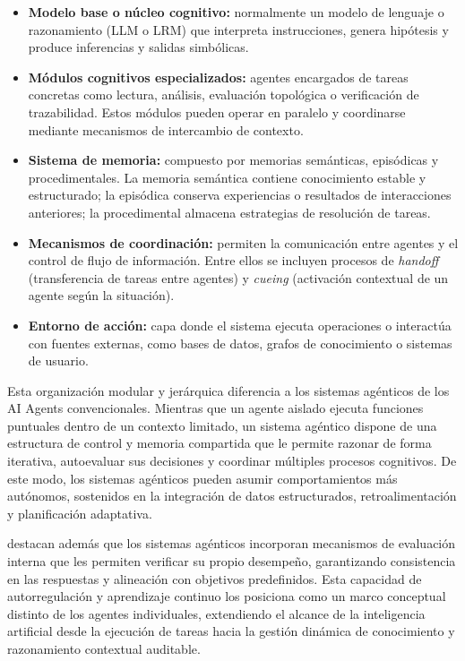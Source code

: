\documentclass[12pt,letterpaper]{article}
\begin{document}
\begin{itemize}
    \item \textbf{Modelo base o núcleo cognitivo:} normalmente un modelo de lenguaje o razonamiento (LLM o LRM) que interpreta instrucciones, genera hipótesis y produce inferencias y salidas simbólicas.
    \item \textbf{Módulos cognitivos especializados:} agentes encargados de tareas concretas como lectura, análisis, evaluación topológica o verificación de trazabilidad. Estos módulos pueden operar en paralelo y coordinarse mediante mecanismos de intercambio de contexto.
    \item \textbf{Sistema de memoria:} compuesto por memorias semánticas, episódicas y procedimentales. La memoria semántica contiene conocimiento estable y estructurado; la episódica conserva experiencias o resultados de interacciones anteriores; la procedimental almacena estrategias de resolución de tareas.
    \item \textbf{Mecanismos de coordinación:} permiten la comunicación entre agentes y el control de flujo de información. Entre ellos se incluyen procesos de \textit{handoff} (transferencia de tareas entre agentes) y \textit{cueing} (activación contextual de un agente según la situación).
    \item \textbf{Entorno de acción:} capa donde el sistema ejecuta operaciones o interactúa con fuentes externas, como bases de datos, grafos de conocimiento o sistemas de usuario.
\end{itemize}

Esta organización modular y jerárquica diferencia a los sistemas agénticos de los AI Agents convencionales. Mientras que un agente aislado ejecuta funciones puntuales dentro de un contexto limitado, un sistema agéntico dispone de una estructura de control y memoria compartida que le permite razonar de forma iterativa, autoevaluar sus decisiones y coordinar múltiples procesos cognitivos. De este modo, los sistemas agénticos pueden asumir comportamientos más autónomos, sostenidos en la integración de datos estructurados, retroalimentación y planificación adaptativa.

\cite{Bandi2025} destacan además que los sistemas agénticos incorporan mecanismos de evaluación interna que les permiten verificar su propio desempeño, garantizando consistencia en las respuestas y alineación con objetivos predefinidos. Esta capacidad de autorregulación y aprendizaje continuo los posiciona como un marco conceptual distinto de los agentes individuales, extendiendo el alcance de la inteligencia artificial desde la ejecución de tareas hacia la gestión dinámica de conocimiento y razonamiento contextual auditable.
\end{document}
